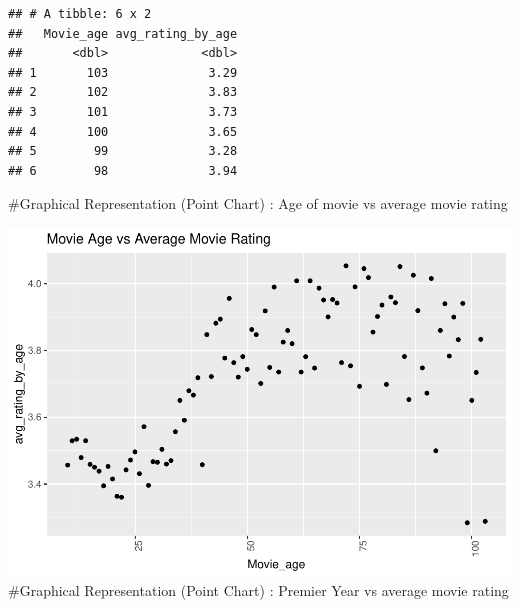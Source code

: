 \documentclass[
]{article}
\newenvironment{Shaded}{\begin{snugshade}}{\end{snugshade}}
\newcommand{\DataTypeTok}[1]{\textcolor[rgb]{0.13,0.29,0.53}{#1}}
\newcommand{\DecValTok}[1]{\textcolor[rgb]{0.00,0.00,0.81}{#1}}
\newcommand{\KeywordTok}[1]{\textcolor[rgb]{0.13,0.29,0.53}{\textbf{#1}}}
\newcommand{\NormalTok}[1]{#1}
\newcommand{\OperatorTok}[1]{\textcolor[rgb]{0.81,0.36,0.00}{\textbf{#1}}}
\newcommand{\StringTok}[1]{\textcolor[rgb]{0.31,0.60,0.02}{#1}}
\begin{document}
\begin{verbatim}
## # A tibble: 6 x 2
##   Movie_age avg_rating_by_age
##       <dbl>             <dbl>
## 1       103              3.29
## 2       102              3.83
## 3       101              3.73
## 4       100              3.65
## 5        99              3.28
## 6        98              3.94
\end{verbatim}

\#Graphical Representation (Point Chart) : Age of movie vs average movie
rating

\begin{Shaded}
\end{Shaded}

\includegraphics{MovieLensProjectReport_files/figure-latex/MovieAge-1.pdf}
\#Graphical Representation (Point Chart) : Premier Year vs average movie
rating
\end{document}
